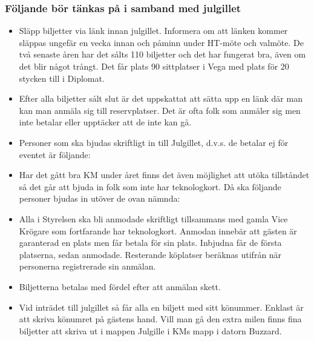 \documentclass[10pt]{article}
\begin{document}
\subsubsection*{Följande bör tänkas på i samband med julgillet}
\begin{itemize}
	\item Släpp biljetter via länk innan julgillet. Informera om att länken kommer släppas
ungefär en vecka innan och påminn under HT-möte och valmöte. De två senaste åren har det sålts 110 biljetter och det har fungerat bra, även om det blir något trångt. Det får plats 90 sittplatser i Vega med plats för 20 stycken till i Diplomat.
	\item Efter alla biljetter sålt slut är det uppskattat att sätta upp en länk där man kan man anmäla sig till reservplatser. Det är ofta folk som anmäler sig men inte betalar eller upptäcker att de inte kan gå.
	\item Personer som ska bjudas skriftligt in till Julgillet, d.v.s. de betalar ej för eventet är följande:
    \item Har det gått bra KM under året finns det även möjlighet att utöka tillståndet så det går att bjuda in folk som inte har teknologkort. Då ska följande personer bjudas in utöver de ovan nämnda:
    \item Alla i Styrelsen ska bli anmodade skriftligt tillsammans med gamla Vice Krögare som fortfarande har teknologkort. Anmodan innebär att gästen är garanterad en plats men får betala för sin plats. Inbjudna får de första platserna, sedan anmodade. Resterande köplatser beräknas utifrån när personerna registrerade sin anmälan.
    \item Biljetterna betalas med fördel efter att anmälan skett.
    \item Vid inträdet till julgillet så får alla en biljett med sitt könummer. Enklast är att skriva könumret på gästens hand. Vill man gå den extra milen finns fina biljetter att skriva ut i mappen Julgille i KMs mapp i datorn Buzzard.

\end{itemize}
\end{document}
